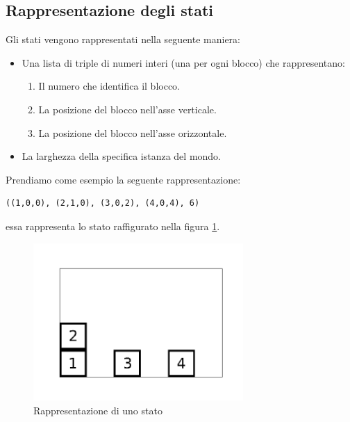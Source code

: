 \documentclass{article}
\begin{document}
	\subsection{Rappresentazione degli stati}
	Gli stati vengono rappresentati nella seguente maniera:
	\begin{itemize}
		\item Una lista di triple di numeri interi (una per ogni blocco) che rappresentano:
		\begin{enumerate}
			\item Il numero che identifica il blocco.
			\item La posizione del blocco nell'asse verticale.
			\item La posizione del blocco nell'asse orizzontale.
		\end{enumerate}
		\item La larghezza della specifica istanza del mondo.
	\end{itemize}
	Prendiamo come esempio la seguente rappresentazione:
	\begin{verbatim}
((1,0,0), (2,1,0), (3,0,2), (4,0,4), 6)
	\end{verbatim}
	essa rappresenta lo stato raffigurato nella figura \ref{fig:state_ex}.
	\begin{figure}[H]
		\centering
		\includegraphics[width=8cm]{./images/example_state.png}
		\caption{Rappresentazione di uno stato}
		\label{fig:state_ex}
	\end{figure}
	
\end{document}
